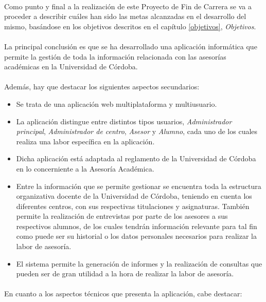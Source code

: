 \paragraph{}Como punto y final a la realización de este Proyecto de Fin de
Carrera se va a proceder a describir cuáles han sido las metas alcanzadas en el
desarrollo del mismo, basándose en los objetivos descritos en el capítulo
\ref{objetivos}, \textit{Objetivos}.

\paragraph{}La principal conclusión es que se ha desarrollado una aplicación
 informática que permite la gestión de toda la información relacionada con las
 asesorías académicas en la Universidad de Córdoba.

\paragraph{}Además, hay que destacar los siguientes aspectos secundarios:

\begin{itemize}
 \item Se trata de una aplicación web multiplataforma y multiusuario.
 \item La aplicación distingue entre distintos tipos usuarios,
 \textit{Administrador principal}, \textit{Administrador de centro},
 \textit{Asesor} y \textit{Alumno}, cada uno de los cuales realiza una labor
 específica en la aplicación.
 \item Dicha aplicación está adaptada al reglamento de la Universidad de
 Córdoba en lo concerniente a la Asesoría Académica.
 \item Entre la información que se permite gestionar se encuentra toda la
 estructura organizativa docente de la Universidad de Córdoba, teniendo en
 cuenta los diferentes centros, con sus respectivas titulaciones y asignaturas.
 También permite la realización de entrevistas por parte de los asesores a sus
 respectivos alumnos, de los cuales tendrán información relevante para tal fin
 como puede ser su historial o los datos personales necesarios para realizar la
 labor de asesoría.
 \item El sistema permite la generación de informes y la realización de
 consultas que pueden ser de gran utilidad a la hora de realizar la labor
 de asesoría.
\end{itemize}

\paragraph{}En cuanto a los aspectos técnicos que presenta la aplicación, cabe
destacar:

